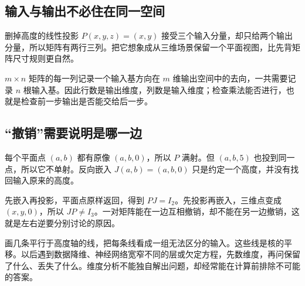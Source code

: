 \subsection*{输入与输出不必住在同一空间}
删掉高度的线性投影 $P(x,y,z)=(x,y)$ 接受三个输入分量，却只给两个输出分量，所以矩阵有两行三列。把它想象成从三维场景保留一个平面视图，比先背矩阵尺寸规则更自然。

$m\times n$ 矩阵的每一列记录一个输入基方向在 $m$ 维输出空间中的去向，一共需要记录 $n$ 根输入基。因此行数是输出维度，列数是输入维度；检查乘法能否进行，也就是检查前一步输出是否能交给后一步。

\subsection*{“撤销”需要说明是哪一边}
每个平面点 $(a,b)$ 都有原像 $(a,b,0)$，所以 $P$ 满射。但 $(a,b,5)$ 也投到同一点，所以它不单射。反向嵌入 $J(a,b)=(a,b,0)$ 只是约定一个高度，并没有找回输入原来的高度。

先嵌入再投影，平面点原样返回，得到 $PJ=I_2$。先投影再嵌入，三维点变成 $(x,y,0)$，所以 $JP\ne I_3$。一对矩阵能在一边互相撤销，却不能在另一边撤销，这就是左右逆要分别讨论的原因。

画几条平行于高度轴的线，把每条线看成一组无法区分的输入。这些线是核的平移。以后遇到数据降维、神经网络宽窄不同的层或欠定方程，先数维度，再问保留了什么、丢失了什么。维度分析不能独自解出问题，却经常能在计算前排除不可能的答案。
